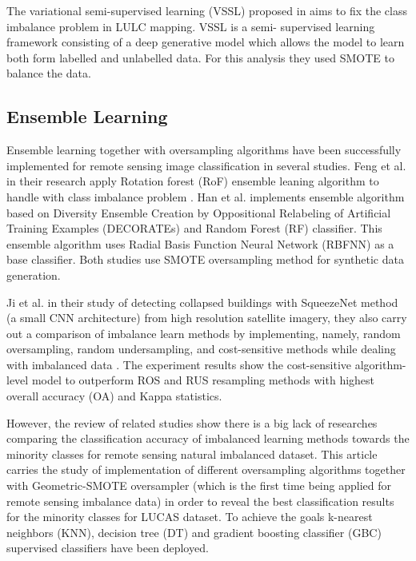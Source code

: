 \documentclass[parskip=full]{scrartcl}
\begin{document}
The variational semi-supervised learning (VSSL) proposed in \cite{Cenggoro2018}
aims to fix the class imbalance problem in LULC mapping. VSSL is a semi-
supervised learning framework consisting of a deep generative model which
allows the model to learn both form labelled and unlabelled data. For this
analysis they used SMOTE to balance the data.

\subsection{Ensemble Learning}
Ensemble learning together with oversampling algorithms have been successfully
implemented for remote sensing image classification in several studies. Feng et
al. in their research apply Rotation forest (RoF) ensemble leaning algorithm to
handle with class imbalance problem \cite{Feng2019}. Han et al. \cite{Han2012}
implements ensemble algorithm based on Diversity Ensemble Creation by
Oppositional Relabeling of Artificial Training Examples (DECORATEs) and Random
Forest (RF) classifier. This ensemble algorithm uses Radial Basis Function
Neural Network (RBFNN) as a base classifier. Both studies use SMOTE oversampling
method for synthetic data generation.

Ji et al. in their study of detecting collapsed buildings with SqueezeNet method
(a small CNN architecture) from high resolution satellite imagery, they also
carry out a comparison of imbalance learn methods by implementing, namely,
random oversampling, random undersampling, and cost-sensitive methods while
dealing with imbalanced data \cite{Ji2018}. The experiment results show the
cost-sensitive algorithm-level model to outperform ROS and RUS resampling
methods with highest overall accuracy (OA) and Kappa statistics.

However, the review of related studies show there is a big lack of researches
comparing the classification accuracy of imbalanced learning methods towards the
minority classes for remote sensing natural imbalanced dataset. This article
carries the study of implementation of different oversampling algorithms
together with Geometric-SMOTE oversampler (which is the first time being applied
for remote sensing imbalance data) in order to reveal the best classification
results for the minority classes for LUCAS dataset.  To achieve the goals
k-nearest neighbors (KNN), decision tree (DT) and gradient boosting classifier
(GBC) supervised classifiers have been deployed.
\end{document}
